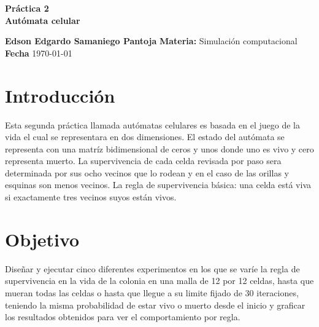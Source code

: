 \documentclass[a4paper, 11pt]{article}
\begin{document}
\begin{center}
\LARGE \bf Pr\'actica 2\\ Autómata celular
\end{center}

\vspace{1cm} 
\noindent\textbf {Edson Edgardo Samaniego Pantoja} \hfill \textbf{Materia:} Simulación computacional 
\hfill \\
\textbf{Fecha} \today  
\vspace{1cm} 

\section{Introducción}
Esta segunda práctica llamada autómatas celulares es basada en el juego de la vida el cual se representara en dos dimensiones. El estado del autómata se representa con una matríz bidimensional de ceros y unos donde uno es vivo y cero representa muerto. La supervivencia de cada celda revisada por paso sera determinada por sus ocho vecinos que lo rodean y en el caso de las orillas y esquinas son menos vecinos.
La regla de supervivencia básica: una celda está viva si exactamente tres vecinos suyos están vivos.

\section{Objetivo}
Diseñar y ejecutar cinco diferentes experimentos en los que se varíe la regla de supervivencia en la vida de la colonia en una malla de 12 por 12 celdas, hasta que mueran todas las celdas o hasta que llegue a su limite fijado de 30 iteraciones, teniendo la misma probabilidad de estar vivo o muerto desde el inicio y graficar los resultados obtenidos para ver el comportamiento por regla.
\end{document}
